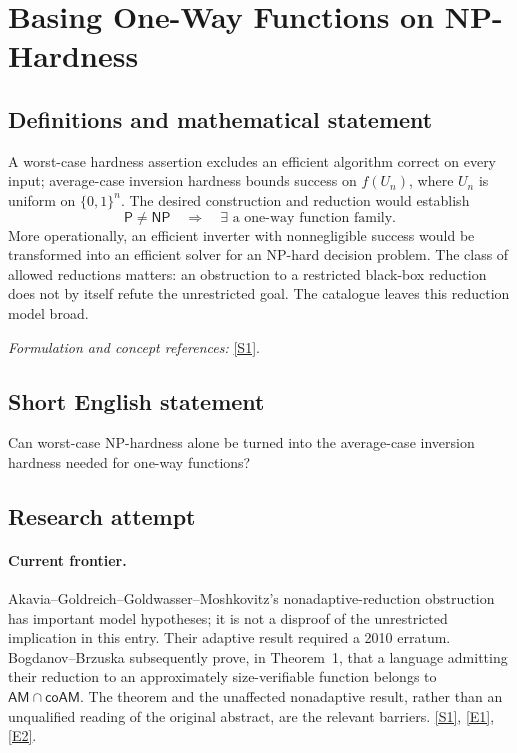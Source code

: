\documentclass[11pt,a4paper]{article}
\newcommand{\sref}[2]{\hyperlink{source:#1:#2}{[S#2]}}
\newcommand{\eref}[2]{\hyperlink{extra:#1:#2}{[E#2]}}
\newif\ifshowcatalogue
\newcommand{\cataloguescope}[1]{\ifshowcatalogue
 \paragraph{Exact scope in the supplied catalogue.}
 \begin{quote}\small #1\end{quote}\fi}
\numberwithin{equation}{section}
\begin{document}
\setcounter{section}{0}
\clearpage
\section*{\texorpdfstring{Basing One-Way Functions on NP-Hardness}{Basing One-Way Functions on NP-Hardness}}\label{statement}
\subsection{Definitions and mathematical statement}
A worst-case hardness assertion excludes an efficient algorithm correct on every input; average-case inversion hardness bounds success on $f(U_n)$, where $U_n$ is uniform on $\{0,1\}^n$. The desired construction and reduction would establish
\[
 \mathsf P\ne\mathsf{NP}\quad\Longrightarrow\quad
 \exists\text{ a one-way function family}.
\]
More operationally, an efficient inverter with nonnegligible success would be transformed into an efficient solver for an NP-hard decision problem. The class of allowed reductions matters: an obstruction to a restricted black-box reduction does not by itself refute the unrestricted goal. The catalogue leaves this reduction model broad.
\par\smallskip\textit{Formulation and concept references:} \sref{statement}{1}.
\cataloguescope{Determine whether one-way functions can be based on NP-hardness, i.e., whether there is a reduction from a worst-case NP-complete (or NP-hard) decision problem to the task of average-case inverting a polynomial-time computable function, so that P != NP would imply the existence of one-way functions.}
\subsection{Short English statement}
Can worst-case NP-hardness alone be turned into the average-case inversion hardness needed for one-way functions?
\subsection{Research attempt}

\paragraph{Current frontier.}
Akavia--Goldreich--Goldwasser--Moshkovitz's nonadaptive-reduction obstruction
has important model hypotheses; it is not a disproof of the unrestricted
implication in this entry. Their adaptive result required a 2010 erratum.
Bogdanov--Brzuska subsequently prove, in Theorem~1, that a language admitting
their reduction to an approximately size-verifiable function belongs to
$\mathsf{AM}\cap\mathsf{coAM}$. The theorem and the unaffected nonadaptive
result, rather than an unqualified reading of the original abstract, are the
relevant barriers. \sref{statement}{1}, \eref{statement}{1}, \eref{statement}{2}.
\end{document}
